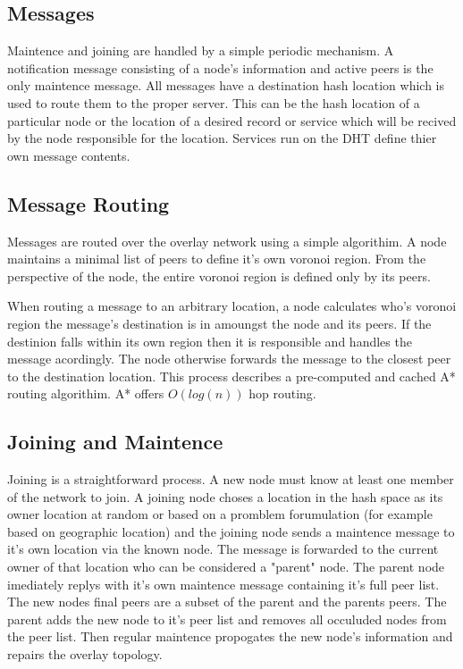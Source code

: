 \documentclass[11pt]{IEEEtran} %
\begin{document}
\subsection{Messages}
Maintence and joining are handled by a simple periodic mechanism. A notification message consisting of a node's information and active peers is the only maintence message. All messages have a destination hash location which is used to route them to the proper server. This can be the hash location of a particular node or the location of a desired record or service which will be recived by the node responsible for the location. Services run on the DHT define thier own message contents.

\subsection{Message Routing}
Messages are routed over the overlay network using a simple algorithim. A node maintains a minimal list of peers to define it's own voronoi region.  From the perspective of the node, the entire voronoi region is defined only by its peers.

When routing a message to an arbitrary location, a node calculates who's voronoi region the message's destination is in amoungst the node and its peers. If the destinion falls within its own region then it is responsible and handles the message acordingly. The node otherwise forwards the message to the closest peer to the destination location. This process describes a pre-computed and cached A* \cite{astar} routing algorithim. A* offers $O(log(n))$ hop routing.




\subsection{Joining and Maintence}
Joining is a straightforward process. A new node must know at least one member of the network to join. A joining node choses a location in the hash space as its owner location at random or based on a promblem forumulation (for example based on geographic location) and the joining node sends a maintence message to it's own location via the known node. The message is forwarded to the current owner of that location who can be considered a "parent" node. The parent node imediately replys with it's own maintence message containing it's full peer list. The new nodes final peers are a subset of the parent and the parents peers. The parent adds the new node to it's peer list and removes all occuluded nodes from the peer list. Then regular maintence propogates the new node's information and repairs the overlay topology.
\end{document}
